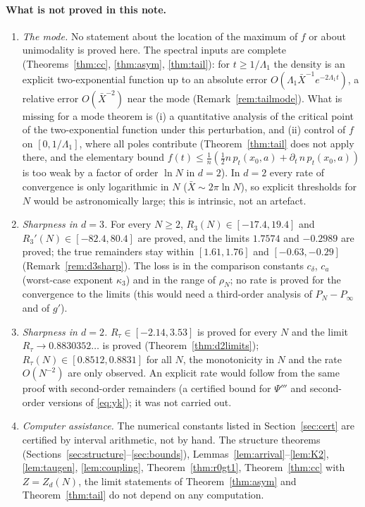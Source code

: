 \documentclass[11pt,a4paper]{article}
\newcommand{\Xb}{\bar X}
\theoremstyle{plain}
\theoremstyle{definition}
\numberwithin{equation}{section}
\begin{document}
\paragraph{What is not proved in this note.}
\begin{enumerate}
\item[(G1)] \emph{The mode.} No statement about the location of the maximum of $f$ or about unimodality is proved here. The spectral inputs are complete (Theorems~\ref{thm:cc}, \ref{thm:asym}, \ref{thm:tail}): for $t\ge1/\Lambda_1$ the density is an explicit two-exponential function up to an absolute error $O(\Lambda_1\Xb^{-1}e^{-2\Lambda_1t})$, a relative error $O(\Xb^{-2})$ near the mode (Remark~\ref{rem:tailmode}). What is missing for a mode theorem is (i) a quantitative analysis of the critical point of the two-exponential function under this perturbation, and (ii) control of $f$ on $[0,1/\Lambda_1]$, where all poles contribute (Theorem~\ref{thm:tail} does not apply there, and the elementary bound $f(t)\le\frac1n(\frac12n\,p_t(x_0,a)+\partial_t\,n\,p_t(x_0,a))$ is too weak by a factor of order $\ln N$ in $d=2$). In $d=2$ every rate of convergence is only logarithmic in $N$ ($\Xb\sim2\pi\ln N$), so explicit thresholds for $N$ would be astronomically large; this is intrinsic, not an artefact.
\item[(G2)] \emph{Sharpness in $d=3$.} For every $N\ge2$, $R_3(N)\in[-17.4,19.4]$ and $R_3'(N)\in[-82.4,80.4]$ are proved, and the limits $1.7574$ and $-0.2989$ are proved; the true remainders stay within $[1.61,1.76]$ and $[-0.63,-0.29]$ (Remark~\ref{rem:d3sharp}). The loss is in the comparison constants $c_\delta$, $c_a$ (worst-case exponent $\kappa_3$) and in the range of $\rho_N$; no rate is proved for the convergence to the limits (this would need a third-order analysis of $P_N-P_\infty$ and of $g'$).
\item[(G3)] \emph{Sharpness in $d=2$.} $R_\tau\in[-2.14,3.53]$ is proved for every $N$ and the limit $R_\tau\to0.8830352\ldots$ is proved (Theorem~\ref{thm:d2limits}); $R_\tau(N)\in[0.8512,0.8831]$ for all $N$, the monotonicity in $N$ and the rate $O(N^{-2})$ are only observed. An explicit rate would follow from the same proof with second-order remainders (a certified bound for $\Psi'''$ and second-order versions of \eqref{eq:yk}); it was not carried out.
\item[(G4)] \emph{Computer assistance.} The numerical constants listed in Section~\ref{sec:cert} are certified by interval arithmetic, not by hand. The structure theorems (Sections~\ref{sec:structure}--\ref{sec:bounds}), Lemmas~\ref{lem:arrival}--\ref{lem:K2}, \ref{lem:taugen}, \ref{lem:coupling}, Theorem~\ref{thm:r0gt1}, Theorem~\ref{thm:cc} with $Z=Z_d(N)$, the limit statements of Theorem~\ref{thm:asym} and Theorem~\ref{thm:tail} do not depend on any computation.

\end{enumerate}
\end{document}
